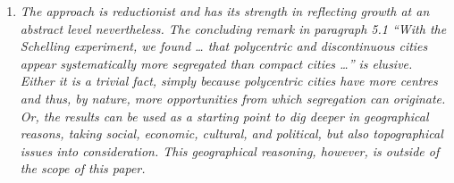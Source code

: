 \documentclass[11pt,a4paper,sans]{moderncv}        %
\begin{document}
\begin{enumerate}
 
  \item \textit{The approach is reductionist and has its strength in reflecting growth at an abstract level nevertheless. The concluding remark in paragraph 5.1 “With the Schelling experiment, we found … that polycentric and discontinuous cities appear systematically more segregated than compact cities …” is elusive. Either it is a trivial fact, simply because polycentric cities have more centres and thus, by nature, more opportunities from which segregation can originate. Or, the results can be used as a starting point to dig deeper in geographical reasons, taking social, economic, cultural, and political, but also topographical issues into consideration. This geographical reasoning, however, is outside of the scope of this paper. }

\end{enumerate}
\end{document}
